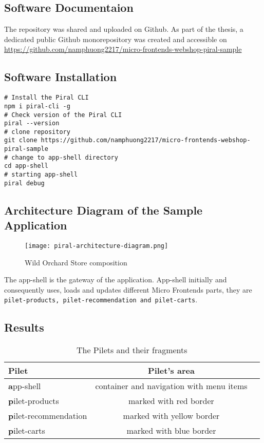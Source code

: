 \documentclass[a4paper]{book}
\begin{document}
\subsection{Software Documentaion}
The repository was shared and uploaded on Github. As part of the thesis, a dedicated public Github monorepository was created and accessible on \url{https://github.com/namphuong2217/micro-frontends-webshop-piral-sample}

\subsection{Software Installation} \label{Software Installation}

\begin{lstlisting}[caption={Installation step by step (\url{https://docs.piral.io/guidelines/tutorials/02-getting-started})}]
# Install the Piral CLI
npm i piral-cli -g
# Check version of the Piral CLI
piral --version
# clone repository
git clone https://github.com/namphuong2217/micro-frontends-webshop-piral-sample
# change to app-shell directory
cd app-shell
# starting app-shell
piral debug 
\end{lstlisting}

\subsection{Architecture Diagram of the Sample Application}
\clearpage
\begin{figure}[ht!]
  \centering
  \captionsetup{justification=centering}
  \texttt{[image: piral-architecture-diagram.png]}
  \caption{Wild Orchard Store composition}
  \label{fig:piral-architecture-diagram}
\end{figure}
The app-shell is the gateway of the application. App-shell initially and consequently uses, loads and updates different Micro Frontends parts, they are \verb|pilet-products, pilet-recommendation and pilet-carts|.

\subsection{Results}

\begin{table}[h!]
    \captionsetup{justification=centering}
    \caption{The Pilets and their fragments}
    \label{tab:example_1}
    \centering
    \begin{tabular}{l | cc}
	\toprule
			\textbf{Pilet} & \textbf{Pilet's area}\\
	\midrule
	\textbf app-shell & container and navigation with menu items\\
	\textbf pilet-products              & marked with red border\\
	\textbf pilet-recommendation             & marked with yellow border\\
	\textbf pilet-carts              & marked with blue border\\
	\bottomrule
    \end{tabular}
\end{table}
\end{document}
